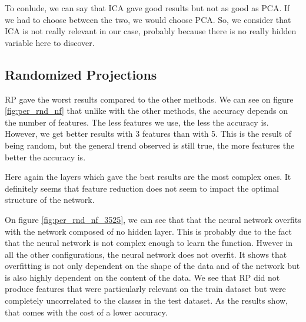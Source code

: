 \documentclass[twocolumn, 10pt]{article}
\begin{document}
			To conlude, we can say that ICA gave good results but not as good as PCA. If we had to choose between the two, we would choose PCA. So, we consider that ICA is not really relevant in our case, probably because there is no really hidden variable here to discover.
		\subsection{Randomized Projections}
			RP gave the worst results compared to the other methods. We can see on figure \ref{fig:per_rnd_nf} that unlike with the other methods, the accuracy depends on the number of features. The less features we use, the less the accuracy is. However, we get better results with 3 features than with 5. This is the result of being random, but the general
			trend observed is still true, the more features the better the accuracy is.

			Here again the layers which gave the best results are the most complex ones. It definitely seems that feature reduction does not seem to impact the optimal structure of the network.

			On figure \ref{fig:per_rnd_nf_3525}, we can see that that the neural network overfits with the network composed of no hidden layer. This is probably due to the fact that the neural network is not complex enough to learn the function. Hwever in all the other configurations, the neural network does not overfit. It shows that overfitting is not only dependent on the shape of the data and of the network but is also highly dependent on the content of the data. We see that RP did not produce features that were particularly relevant on the train dataset but were completely uncorrelated to the classes in the test dataset. As the results show, that comes with the cost of a lower accuracy.
\end{document}
